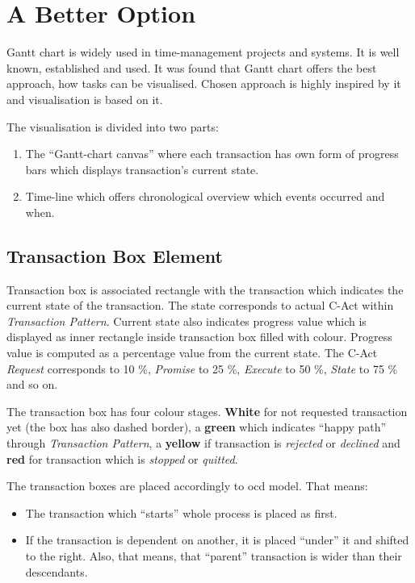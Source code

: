 \section{A Better Option}
Gantt chart is widely used in time-management projects and systems. It is well known, established and used. It was found that Gantt chart offers the best approach, how tasks can be visualised. Chosen approach is highly inspired by it and visualisation is based on it. 

The visualisation is divided into two parts:
\begin{enumerate}
\item The ``Gantt-chart canvas'' where each transaction has own form of progress bars which displays transaction's current state.
\item Time-line which offers chronological overview which events occurred and when. 
\end{enumerate}
\subsection{Transaction Box Element}
Transaction box is associated rectangle with the transaction which indicates the current state of the transaction. The state corresponds to actual C-Act within \textit{Transaction Pattern}. Current state also indicates progress value which is displayed as inner rectangle inside transaction box filled with colour. Progress value is computed as a percentage value from the current state. The C-Act \textit{Request} corresponds to 10 \%, \textit{Promise} to 25 \%, \textit{Execute} to 50 \%, \textit{State} to 75 \% and so on.  

The transaction box has four colour stages. \textbf{White} for not requested transaction yet (the box has also dashed border), a \textbf{green} which indicates ``happy path'' through \textit{Transaction Pattern}, a \textbf{yellow} if transaction is \textit{rejected} or \textit{declined} and \textbf{red} for transaction which is \textit{stopped} or \textit{quitted}. 

The transaction boxes are placed accordingly to \gls{ocd} model. That means:
\begin{itemize}
\item The transaction which ``starts'' whole process is placed as first. 
\item If the transaction is dependent on another, it is placed ``under'' it and shifted to the right. Also, that means, that ``parent'' transaction is wider than their descendants. 
\end{itemize}
